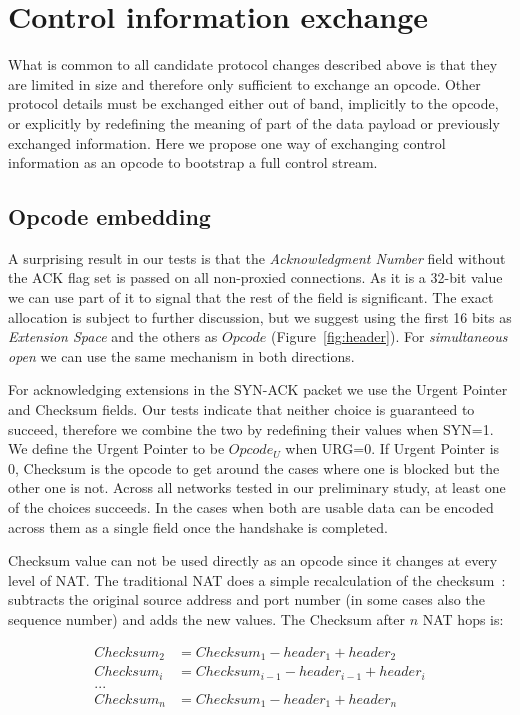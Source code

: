\documentclass{sig-alternate-10pt}
\begin{document}
\section{Control information exchange}
\label{sec:protocol}

What is common to all candidate protocol changes described above is that they are limited in size and therefore only sufficient to exchange an opcode. Other protocol details must be exchanged either out of band, implicitly to the opcode, or explicitly by redefining the meaning of part of the data payload or previously exchanged information. Here we propose one way of exchanging control information as an opcode to bootstrap a full control stream.

\subsection{Opcode embedding}

A surprising result in our tests is that the \emph{Acknowledgment Number} field without the ACK flag set is passed on all non-proxied connections. As it is a 32-bit value we can use part of it to signal that the rest of the field is significant. The exact allocation is subject to further discussion, but we suggest using the first 16 bits as \emph{Extension Space} and the others as $Opcode$ (Figure~\ref{fig:header}). For \emph{simultaneous open} we can use the same mechanism in both directions.

For acknowledging extensions in the SYN-ACK packet we use the Urgent Pointer and Checksum fields. Our tests indicate that neither choice is guaranteed to succeed, therefore we combine the two by redefining their values when SYN=1. We define the Urgent Pointer to be $Opcode_U$ when URG=0. If Urgent Pointer is 0, Checksum is the opcode to get around the cases where one is blocked but the other one is not. Across all networks tested in our preliminary study, at least one of the choices succeeds. In the cases when both are usable data can be encoded across them as a single field once the handshake is completed.

Checksum value can not be used directly as an opcode since it changes at every level of NAT. The traditional NAT does a simple recalculation of the checksum~\cite{Egevang:tu}: subtracts the original source address and port number (in some cases also the sequence number) and adds the new values. The Checksum after \(n\) NAT hops is:

\begin{align*}
Checksum_2 & = Checksum_1 - header_1 + header_2 \\
Checksum_i & = Checksum_{i-1} - header_{i-1} + header_i \\
 ... \\
Checksum_n & = Checksum_1 - header_1 + header_n
\end{align*}
\end{document}
